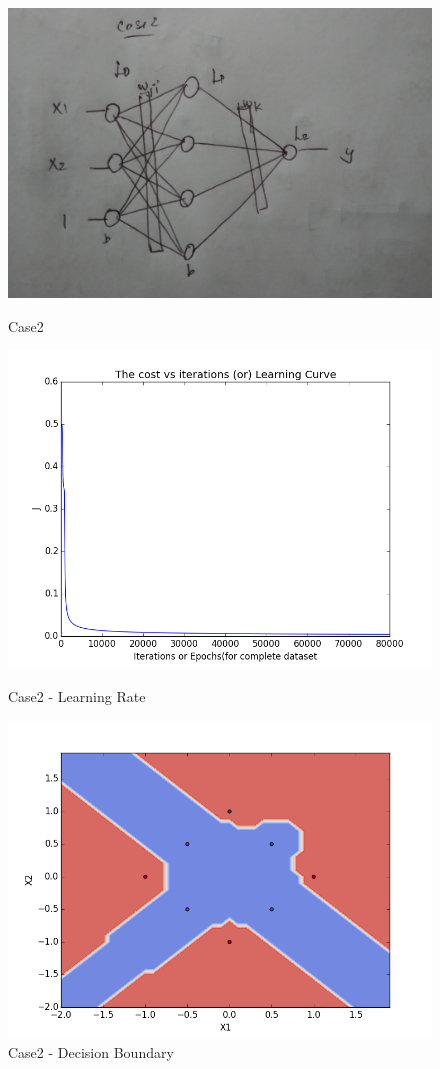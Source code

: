 \documentclass[10pt, letterpaper]{article}
\begin{document}
\begin{enumerate}
\begin{figure}[h!]
\centering
\includegraphics[scale=0.1]{case2.jpg}
\caption{Case2}
\label{fig:Case2}

\centering
\includegraphics[scale=0.5]{3_4_1_learning.png}
\caption{Case2 - Learning Rate}
\label{fig:LR2}

\centering
\includegraphics[scale=0.5]{3_4_1.png}
\caption{Case2 - Decision Boundary}
\label{fig:d2}
\end{figure}


\end{enumerate}
\end{document}
